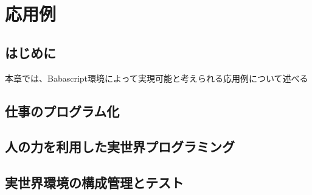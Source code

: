 \chapter{応用例}
\label{chap:application}

\section{はじめに}

本章では、Babascript環境によって実現可能と考えられる応用例について述べる

\section{仕事のプログラム化}
\section{人の力を利用した実世界プログラミング}
\section{実世界環境の構成管理とテスト}
